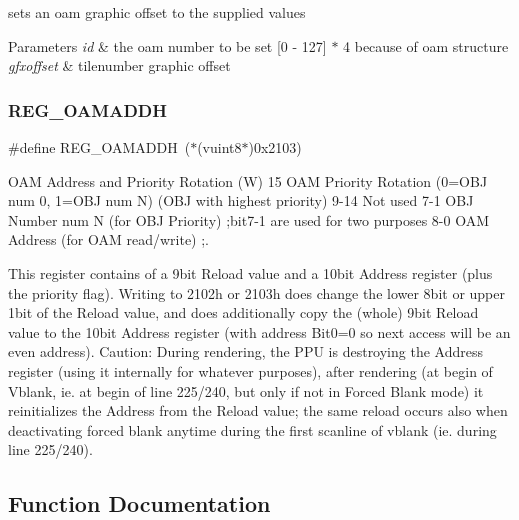 sets an oam graphic offset to the supplied values 


\begin{DoxyParams}{Parameters}
{\em id} & the oam number to be set \mbox{[}0 -\/ 127\mbox{]} $\ast$ 4 because of oam structure \\
\hline
{\em gfxoffset} & tilenumber graphic offset \\
\hline
\end{DoxyParams}
\mbox{\label{a00350_ad8e30bb8ad62f2a58545ff770db95174}} 
\subsubsection{\texorpdfstring{R\+E\+G\+\_\+\+O\+A\+M\+A\+D\+DH}{REG\_OAMADDH}}
{\footnotesize\ttfamily \#define R\+E\+G\+\_\+\+O\+A\+M\+A\+D\+DH~($\ast$(vuint8$\ast$)0x2103)}



O\+AM Address and Priority Rotation (W) 15 O\+AM Priority Rotation (0=O\+BJ num 0, 1=O\+BJ num N) (O\+BJ with highest priority) 9-\/14 Not used 7-\/1 O\+BJ Number num N (for O\+BJ Priority) ;bit7-\/1 are used for two purposes 8-\/0 O\+AM Address (for O\+AM read/write) ;. 

This register contains of a 9bit Reload value and a 10bit Address register (plus the priority flag). Writing to 2102h or 2103h does change the lower 8bit or upper 1bit of the Reload value, and does additionally copy the (whole) 9bit Reload value to the 10bit Address register (with address Bit0=0 so next access will be an even address). Caution\+: During rendering, the P\+PU is destroying the Address register (using it internally for whatever purposes), after rendering (at begin of Vblank, ie. at begin of line 225/240, but only if not in Forced Blank mode) it reinitializes the Address from the Reload value; the same reload occurs also when deactivating forced blank anytime during the first scanline of vblank (ie. during line 225/240). 

\subsection{Function Documentation}
\mbox{\label{a00350_a480021d319f990d930da8fc7fb11fce4}} 
